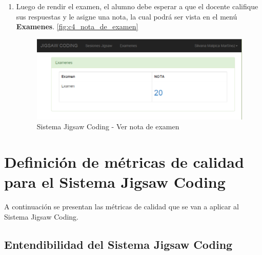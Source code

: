 \begin{enumerate}
	\item Luego de rendir el examen, el alumno debe esperar a que el docente califique sus respuestas y le asigne una nota, la cual podrá ser vista en el menú \textbf{Examenes}. \autoref{fig:c4_nota_de_examen}
	
	\begin{figure}[h!]
		\centering
		\caption{Sistema Jigsaw Coding - Ver nota de examen}
		\label{fig:c4_nota_de_examen}
		\includegraphics[scale=0.2]{figuras/usodelsistema/alumno/nota_de_examen}
	\end{figure}
	
\end{enumerate}
\clearpage
\section{Definición de métricas de calidad para el Sistema Jigsaw Coding}
A continuación se presentan las métricas de calidad que se van a aplicar al Sistema Jigsaw Coding.

\subsection{Entendibilidad del Sistema Jigsaw Coding}

